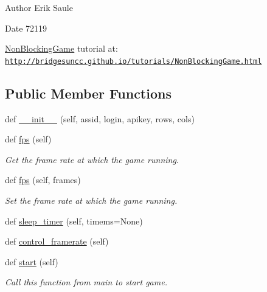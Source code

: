 \begin{DoxyAuthor}{Author}
Erik Saule 
\end{DoxyAuthor}
\begin{DoxyDate}{Date}
72119
\end{DoxyDate}
\hyperlink{classbridges_1_1non__blocking__game_1_1_non_blocking_game}{Non\+Blocking\+Game} tutorial at\+: \href{http://bridgesuncc.github.io/tutorials/NonBlockingGame.html}{\tt http\+://bridgesuncc.\+github.\+io/tutorials/\+Non\+Blocking\+Game.\+html} \subsection*{Public Member Functions}
\begin{DoxyCompactItemize}
\item 
def \hyperlink{classbridges_1_1non__blocking__game_1_1_non_blocking_game_aded027939d7461e5b8e04a1cd5554a66}{\+\_\+\+\_\+init\+\_\+\+\_\+} (self, assid, login, apikey, rows, cols)
\item 
def \hyperlink{classbridges_1_1non__blocking__game_1_1_non_blocking_game_a5763c5a20f130943cec948a9f42803a0}{fps} (self)
\begin{DoxyCompactList}\small\item\em Get the frame rate at which the game running. \end{DoxyCompactList}\item 
def \hyperlink{classbridges_1_1non__blocking__game_1_1_non_blocking_game_a46b4b4a25c7c7ffc78126a7b693b7ceb}{fps} (self, frames)
\begin{DoxyCompactList}\small\item\em Set the frame rate at which the game running. \end{DoxyCompactList}\item 
def \hyperlink{classbridges_1_1non__blocking__game_1_1_non_blocking_game_a2e4dca6a290c65472200e69012e01d16}{sleep\+\_\+timer} (self, timems=None)
\item 
def \hyperlink{classbridges_1_1non__blocking__game_1_1_non_blocking_game_ad751eeccbf14adc09f9c11acce3757c9}{control\+\_\+framerate} (self)
\item 
def \hyperlink{classbridges_1_1non__blocking__game_1_1_non_blocking_game_ad6e23c265e1b710114459f0b666d25cb}{start} (self)
\begin{DoxyCompactList}\small\item\em Call this function from main to start game. \end{DoxyCompactList}\item 

\end{DoxyCompactItemize}
